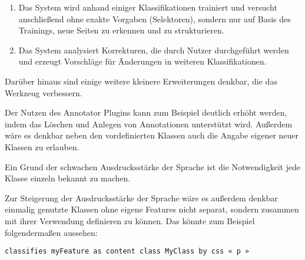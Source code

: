    \begin{enumerate}
        \item   Das System wird anhand einiger Klassifikationen trainiert
                und versucht anschließend ohne exakte Vorgaben (Selektoren),
                sondern nur auf Basis des Trainings,
                neue Seiten zu erkennen und zu strukturieren.
        \item   Das System analysiert Korrekturen, die durch Nutzer durchgeführt werden
                und erzeugt Vorschläge für Änderungen in weiteren Klassifikationen.
    \end{enumerate}

    Darüber hinaus sind einige weitere kleinere Erweiterungen denkbar,
    die das Werkzeug verbessern.

    Der Nutzen des Annotator Plugins kann zum Beispiel deutlich erhöht werden,
    indem das Löschen und Anlegen von Annotationen unterstützt wird.
    Außerdem wäre es denkbar neben den vordefinierten Klassen auch
    die Angabe eigener neuer Klassen zu erlauben.

    Ein Grund der schwachen Ausdrucksstärke der Sprache ist die Notwendigkeit
    jede Klasse einzeln bekannt zu machen.

    Zur Steigerung der Ausdrucksstärke der Sprache wäre es außerdem denkbar
    einmalig genutzte Klassen ohne eigene Features nicht separat,
    sondern zusammen mit ihrer Verwendung definieren zu können.
    Das könnte zum Beispiel folgendermaßen aussehen:

    \begin{lstlisting}[style=wccdl,language=wccdl,inputencoding=utf8/latin1]
classifies myFeature as content class MyClass by css « p »
    \end{lstlisting}
